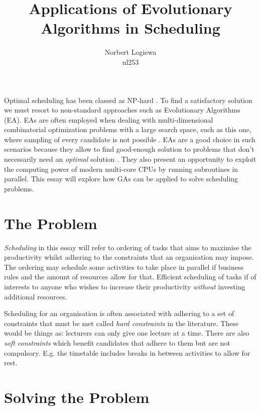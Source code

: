 \documentclass[a4paper, 12pt, titlepage]{article}
\date{} %
\author{Norbert Logiewa\\nl253}
\title{Applications of Evolutionary Algorithms in Scheduling}
\begin{document}
\maketitle

Optimal scheduling has been classed as NP-hard \cite[p.~26]{aljarrah2017}
\cite[p.~52]{diveev2017} \cite[p.~92]{mesghouni2004}.  To find a
satisfactory solution we must resort to non-standard approaches such
as Evolutionary Algorithms (EA). EAs are often employed when dealing
with multi-dimensional combinatorial optimization problems with a large
search space, such as this one, where sampling of every candidate is not
possible \cite[p.~29]{floreano2008} \cite[p.~53]{diveev2017}.  EAs are
a good choice in such scenarios because they allow to find good-enough
solution to problems that don't necessarily need an \emph{optimal}
solution\cite[p.~44]{heaton2014} \cite[p.~53]{diveev2017}.  They also
present an opportunity to exploit the computing power of modern multi-core
CPUs by running subroutines in parallel. \cite[p.~28]{aljarrah2017}
This essay will explore how GAs can be applied to solve scheduling problems.

\section*{The Problem}

\emph{Scheduling} in this essay will refer to ordering of tasks that aims to maximise the
productivity whilst adhering to the constraints that an organisation
may impose.  The ordering may schedule some activities to take place in
parallel if business rules and the amount of resources allow for that.
Efficient scheduling of tasks if of interests to anyone who wishes to
increase their productivity \emph{without} investing additional resources.

Scheduling for an organisation is often associated with adhering to a
set of constraints that must be met called \emph{hard constraints} in
the literature. These would be things as: lecturers can only give one lecture at a time.
There are also \emph{soft constraints} which benefit candidates that
adhere to them but are not compulsory. E.g. the timetable includes breaks
in between activities to allow for rest. \cite[p.~26]{aljarrah2017}
\cite{timilsina2015} \cite[p.~2505]{qaurooni2013} \cite[p.~56]{diveev2017}

\section*{Solving the Problem}
\end{document}

